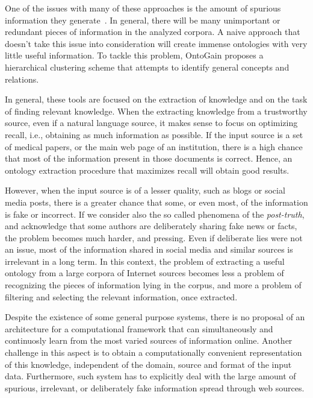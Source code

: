     One of the issues with many of these approaches is the amount of spurious
    information they generate~\cite{Maimon:2015:OLT:2870689.2870690}.
    In general, there will be many unimportant
    or redundant pieces of information in the analyzed corpora. A naive
    approach that doesn't take this issue into consideration will create
    immense ontologies with very little useful information. To tackle
    this problem, OntoGain proposes a hierarchical clustering scheme
    that attempts to identify general concepts and relations.

    In general, these tools are focused on the extraction of knowledge and
    on the task of finding relevant knowledge.
      When the extracting knowledge from a trustworthy source, even if a natural
      language source, it makes sense to
      focus on optimizing recall, i.e., obtaining as much information as possible.
      If the input source is a set of medical papers, or the main
      web page of an institution, there is a high chance that most of the information
      present in those documents is correct. Hence, an ontology extraction procedure
      that maximizes recall will obtain good results.

      However, when the input source is of a lesser quality, such as blogs or
      social media posts, there is a greater chance that some, or even most,
      of the information is fake or incorrect.
      If we consider also the so called phenomena of the \textit{post-truth},
      and acknowledge that some authors are deliberately sharing fake news
      or facts, the problem becomes much harder, and pressing.
      Even if deliberate lies were not an issue, most of the information shared
      in social media and similar sources is irrelevant in a long term.
      In this context, the problem of extracting a useful ontology from a large
      corpora of Internet sources becomes less a problem of recognizing the pieces
      of information lying in the corpus, and more a problem of filtering and selecting
      the relevant information, once extracted.

      Despite the existence of some general purpose systems,
      there is no proposal of an architecture for a computational framework
      that can simultaneously and continuosly learn from the most varied sources of information online.
      Another challenge in this aspect is to obtain a computationally convenient representation
      of this knowledge, independent of the domain, source and format of the input data.
      Furthermore, such system has to explicitly deal with the large amount of spurious,
      irrelevant, or deliberately fake information spread through web sources.

